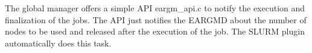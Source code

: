 The global manager offers a simple A\+PI {\ttfamily eargm\+\_\+api.\+c} to notify the execution and finalization of the jobs. The A\+PI just notifies the E\+A\+R\+G\+MD about the number of nodes to be used and released after the execution of the job. The S\+L\+U\+RM plugin automatically does this task. 